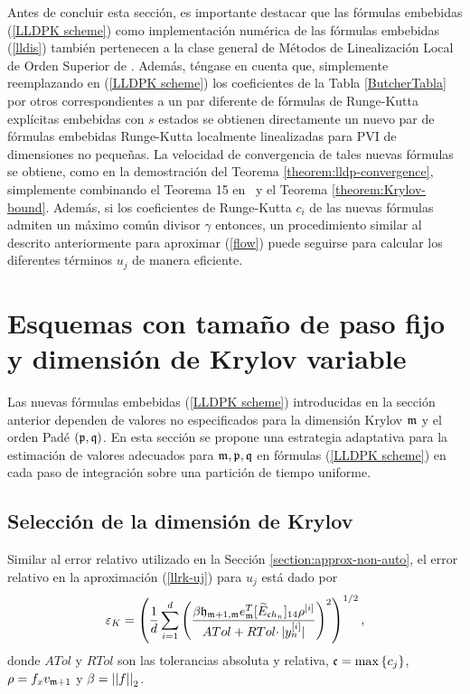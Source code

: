 Antes de concluir esta sección, es importante destacar que las fórmulas embebidas (\ref{LLDPK scheme}) como implementación numérica de las fórmulas embebidas (\ref{lldis}) también pertenecen a la clase general de Métodos de Linealización Local de Orden Superior de \cite{Jimenez13}. Además, téngase en cuenta que, simplemente reemplazando en (\ref{LLDPK scheme}) los coeficientes de la Tabla \ref{ButcherTabla} por otros correspondientes a un par diferente de fórmulas de Runge-Kutta explícitas embebidas con $s$ estados se obtienen directamente un nuevo par de fórmulas embebidas Runge-Kutta localmente linealizadas para PVI de dimensiones no pequeñas. La velocidad de convergencia de tales nuevas fórmulas se obtiene, como en la demostración del Teorema \ref{theorem:lldp-convergence}, simplemente combinando el Teorema 15 en~\cite{Jimenez13} y el Teorema \ref{theorem:Krylov-bound}. Además, si los coeficientes de Runge-Kutta $c_i$ de las nuevas fórmulas admiten un máximo común divisor $\gamma$ entonces, un procedimiento similar al descrito anteriormente para aproximar (\ref{flow}) puede seguirse para calcular los diferentes términos $u_j$ de manera eficiente.

\section{Esquemas con tamaño de paso fijo y dimensión de Krylov variable}\label{section:lldp-fix-step}

Las nuevas fórmulas embebidas (\ref{LLDPK scheme}) introducidas en la sección anterior dependen de valores no especificados para la dimensión Krylov $\mathfrak{m}$ y el orden Padé $(\mathfrak{p} ,\mathfrak{q})$. En esta sección se propone una estrategia adaptativa para la estimación de valores adecuados para $\mathfrak{m}, \mathfrak{p} ,\mathfrak{q}$ en fórmulas (\ref{LLDPK scheme}) en cada paso de integración sobre una partición de tiempo uniforme.

\subsection{Selección de la dimensión de Krylov}\label{sec:selkrydim}

Similar al error relativo utilizado en la Sección \ref{section:approx-non-auto}, el error relativo en la aproximación (\ref{llrk-uj}) para $u_j$ está dado por
\begin{equation}
    \varepsilon_{K} = \left(\frac{1}{d}\sum\limits_{i=1}^{d} \left(\frac{\beta
        \mathfrak{h}_{\mathfrak{m}+1,\mathfrak{m}} e_{\mathfrak{m}}^T
        [\widetilde{E}_{\mathfrak{c}h_n}]_{14} \rho^{[i]}}{ATol+ RTol\cdotp
        \rvert y_{n}^{[i]}\rvert}\right)^{2}\right)^{1/2},
    \label{errrel}
\end{equation}
donde $ATol$ y $RTol$ son las tolerancias absoluta y relativa, $\mathfrak{c}=\max\left\{ c_j \right\}$, $\rho = f_x v_{\mathfrak{m}+1}$ y $\beta=\left\lvert \left\lvert f \right\rvert \right\rvert_2$.

